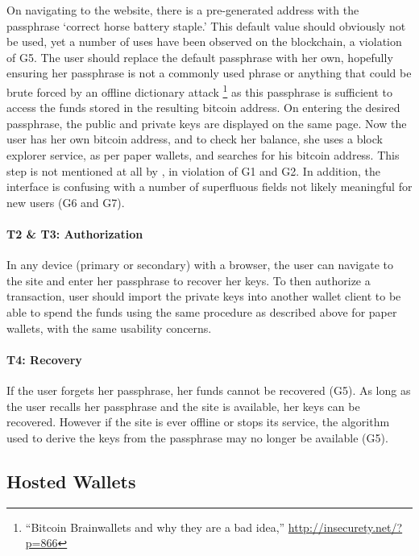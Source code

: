 On navigating to the \brain website, there is a pre-generated address with the passphrase `correct horse battery staple.' This default value should obviously not be used, yet a number of uses have been observed on the blockchain, a violation of G5. The user should replace the default passphrase with her own, hopefully ensuring her passphrase is not a commonly used phrase or anything that could be brute forced by an offline dictionary attack \footnote{``Bitcoin Brainwallets and why they are a bad idea,'' \url{http://insecurety.net/?p=866}} as this passphrase is sufficient to access the funds stored in the resulting bitcoin address. On entering the desired passphrase, the public and private keys are displayed on the same page. Now the user has her own bitcoin address, and to check her balance, she uses  a block explorer service, as per paper wallets, and searches for his bitcoin address. This step is not mentioned at all by \brain, in violation of G1 and G2. In addition, the interface is confusing with a number of superfluous fields not likely meaningful for new users (G6 and G7).

\paragraph{T2 \& T3: Authorization}

In any device (primary or secondary) with a browser, the user can navigate to the \brain site and enter her passphrase to recover her keys. To then authorize a transaction, user should import the private keys into another wallet client to be able to spend the funds using the same procedure as described above for paper wallets, with the same usability concerns.

\paragraph{T4: Recovery} 

If the user forgets her passphrase, her funds cannot be recovered (G5). As long as the user recalls her passphrase and the \brain site is available, her keys can be recovered. However if the site is ever offline or stops its service, the algorithm used to derive the keys from the passphrase may no longer be available (G5).


\subsection{Hosted Wallets}
\label{hosted}

